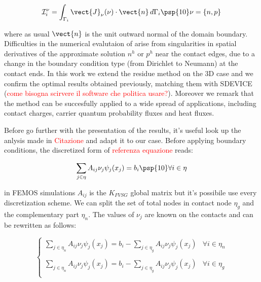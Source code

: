 \begin{equation}
\label{eq: current flux}
\mathcal{I}_i^\nu = \int_{\Gamma_i}\vect{J}_\nu(\nu) \cdot \vect{n} \, d{\Gamma_i} \psp{10} \nu = \{n,p\}
\end{equation}

where as usual $\vect{n}$ is the unit outward normal of the domain boundary. Difficulties in the numerical evalutaion of  arise from singularities in spatial derivatives of the approximate solution $n^h$ or $p^h$ near the contact edges, due to a change in the boundary condition type (from Dirichlet to Neumann) at the contact ends.
In this work we extend the residue method on the 3D case and we confirm the optimal results obtained previously, matching them with SDEVICE (\textcolor{red}{come bisogna scirvere il software che politica usare?}). Moreover we remark that the method can be succesfully applied to a wide spread of applications, including contact charges, carrier quantum probability fluxes and heat fluxes.

Before go further with the presentation of the results, it's useful look up the anlysis made in \textcolor{red}{Citazione} and adapt it to our case. Before applying boundary conditions, the discretized form of \textcolor{red}{referenza equazione} reads:

\begin{equation}
\label{eq: discretization before bc}
\sum_{j\in\eta} A_{ij} \nu_j\psi_j(x_j) = b_i \psp{10} \forall i \in \eta
\end{equation}

in FEMOS simulations $A_{ij}$ is the $K_{FVSG}$ global matrix but it's possibile use every discretization scheme. We can split the set of total nodes in contact node $\eta_g$ and the complementary part $\eta_n$.
The values of $\nu_j$ are known on the contacts and  can be rewritten as follows:

\begin{equation}
\label{eq: discretization before bc 2}
\begin{cases}

\sum_{j\in\eta_n} A_{ij} \nu_j\psi_j(x_j) = b_i - \sum_{j\in\eta_g} A_{ij} \nu_j\psi_j(x_j) & \forall i \in \eta_n \\
\\
\sum_{j\in\eta_n} A_{ij} \nu_j\psi_j(x_j) = b_i - \sum_{j\in\eta_g} A_{ij} \nu_j\psi_j(x_j) & \forall i \in \eta_g \\

\end{cases}
\end{equation}

